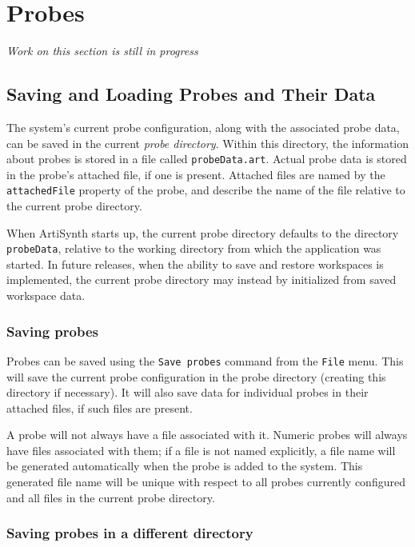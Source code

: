 \documentclass{article}
\begin{document}
\section{Probes}

{\it Work on this section is still in progress}

\subsection{Saving and Loading Probes and Their Data}
\label{savingAndLoadingProbesSec}

The system's current probe configuration, along with the associated
probe data, can be saved in the current {\it probe directory}. Within
this directory, the information about probes is stored in a file
called {\tt probeData.art}. Actual probe data is stored in the probe's
attached file, if one is present.  Attached files are named by the
{\tt attachedFile} property of the probe, and describe the name of
the file relative to the current probe directory.

When ArtiSynth starts up, the current probe directory defaults to the
directory {\tt probeData}, relative to the working directory from
which the application was started. In future releases, when the
ability to save and restore workspaces is implemented, the current
probe directory may instead by initialized from saved workspace data.

\subsubsection{Saving probes}

Probes can be saved using the {\tt Save probes} command from the 
{\tt File} menu. This will save the current probe configuration in the
probe directory (creating this directory if necessary). It will also
save data for individual probes in their attached files, if such files
are present. 

A probe will not always have a file associated with it. Numeric probes
will always have files associated with them; if a file is not named
explicitly, a file name will be generated automatically when the probe
is added to the system. This generated file name will be unique with
respect to all probes currently configured and all files in the
current probe directory.

\subsubsection{Saving probes in a different directory}
\end{document}
